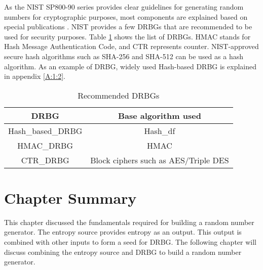 As the NIST SP800-90 series provides clear guidelines for generating random numbers for cryptographic purposes, most components are explained based on special publications \cite{SP90A-2015, SP90B-2018}. NIST provides a few DRBGs that are recommended to be used for security purposes. Table \ref{table:2:2} shows the list of DRBGs. HMAC stands for Hash Message Authentication Code, and CTR represents counter. NIST-approved secure hash algorithms such as SHA-256 and SHA-512 can be used as a hash algorithm. As an example of DRBG, widely used Hash-based DRBG is explained in appendix \ref{A:1:2}.
\begin{table}[!h]
	\centering
	\begin{tabular}{||c c||} 
		\hline
		DRBG & Base algorithm used
		\\ [0.5ex] 
		\hline\hline
		Hash\_based\_DRBG & Hash\_df\\
		HMAC\_DRBG & HMAC\\
		CTR\_DRBG & Block ciphers such as AES/Triple DES\\
		\hline
	\end{tabular}
	\caption{Recommended DRBGs}
	\label{table:2:2}
\end{table}

%
%
\section{Chapter Summary}
\label{sec:fundamentals:Chapter Summary}
This chapter discussed the fundamentals required for building a random number generator. The entropy source provides entropy as an output. This output is combined with other inputs to form a seed for DRBG. The following chapter will discuss combining the entropy source and DRBG to build a random number generator.
